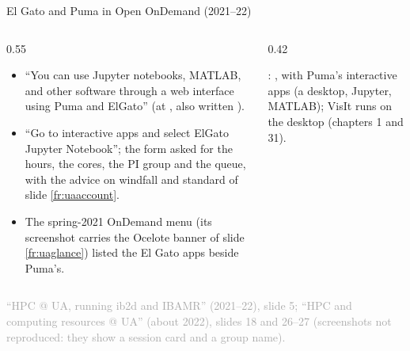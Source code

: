 \documentclass[aspectratio=169,11pt]{beamer}
\newcommand{\sourcecredit}[1]{\vfill\begin{flushright}\tiny\textcolor{DarkGray}{#1}\end{flushright}}
\begin{document}
\begin{frame}{El Gato and Puma in Open OnDemand (2021--22)}
\label{fr:uaood}
\begin{columns}[T,onlytextwidth]
\begin{column}{0.55\textwidth}
\small
\begin{itemize}\setlength{\itemsep}{3pt}
  \item ``You can use Jupyter notebooks, MATLAB, and other software through a web interface using Puma and ElGato'' (at , also written ).
  \item ``Go to interactive apps and select ElGato Jupyter Notebook''; the form asked for the hours, the cores, the PI group and the queue, with the advice on windfall and standard of slide \ref{fr:uaaccount}.
  \item The spring-2021 OnDemand menu (its screenshot carries the Ocelote banner of slide \ref{fr:uaglance}) listed the El Gato apps beside Puma's.
\end{itemize}
\end{column}
\begin{column}{0.42\textwidth}
\begin{punchbox}
\small {}: , with Puma's interactive apps (a desktop, Jupyter, MATLAB); VisIt runs on the desktop (chapters 1 and 31).
\end{punchbox}
\end{column}
\end{columns}
\sourcecredit{``HPC @ UA, running ib2d and IBAMR'' (2021--22), slide 5; ``HPC and computing resources @ UA'' (about 2022), slides 18 and 26--27 (screenshots not reproduced: they show a session card and a group name).}
\end{frame}
\end{document}
